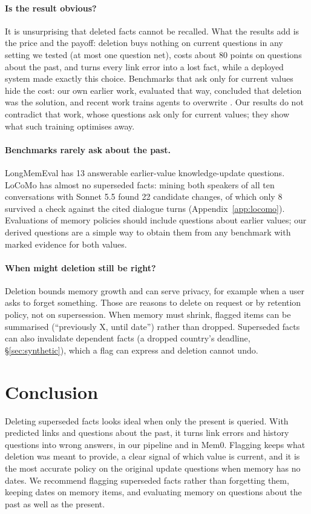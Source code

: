 \documentclass[11pt]{article}
\begin{document}
\paragraph{Is the result obvious?} It is unsurprising that deleted facts cannot be recalled. What
the results add is the price and the payoff: deletion buys nothing on current questions in any
setting we tested (at most one question net), costs about 80 points on questions about the past, and turns every link error into
a lost fact, while a deployed system made exactly this choice. Benchmarks that ask only for current
values hide the cost: our own earlier work, evaluated that way, concluded that deletion was the
solution, and recent work trains agents to overwrite \citep{patel2026supersede}. Our results do not
contradict that work, whose questions ask only for current values; they show what such training
optimises away.

\paragraph{Benchmarks rarely ask about the past.} LongMemEval has 13 answerable earlier-value
knowledge-update questions. LoCoMo has almost no superseded facts: mining both speakers of all ten
conversations with Sonnet 5.5 found 22 candidate changes, of which only 8 survived a check against
the cited dialogue turns (Appendix~\ref{app:locomo}). Evaluations of memory policies should include
questions about earlier values; our derived questions are a simple way to obtain them from any
benchmark with marked evidence for both values.

\paragraph{When might deletion still be right?} Deletion bounds memory growth and can serve privacy,
for example when a user asks to forget something. Those are reasons to delete on request or by
retention policy, not on supersession. When memory must shrink, flagged items can be summarised
(``previously X, until date'') rather than dropped. Superseded facts can also invalidate dependent
facts (a dropped country's deadline, \S\ref{sec:synthetic}), which a flag can express and deletion
cannot undo.

\section{Conclusion}

Deleting superseded facts looks ideal when only the present is queried. With predicted links and
questions about the past, it turns link errors and history questions into wrong answers, in our
pipeline and in Mem0. Flagging keeps what deletion was meant to provide, a clear signal of which value
is current, and it is the most accurate policy on the original update questions when memory has no dates. We recommend flagging
superseded facts rather than forgetting them, keeping dates on memory items, and evaluating memory on
questions about the past as well as the present.
\end{document}
